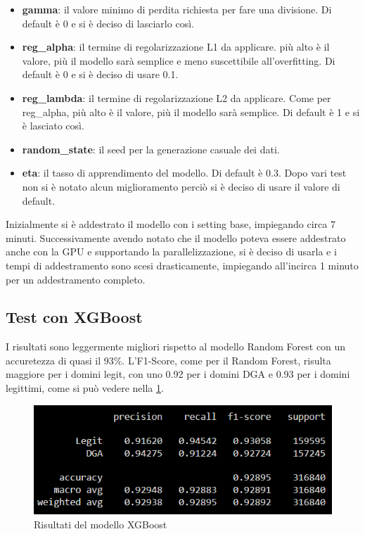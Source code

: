 \documentclass[12pt,a4paper,openright,twoside]{book}
\begin{document}
\begin{itemize}
    \item \textbf{gamma}: il valore minimo di perdita richiesta per fare una divisione.
    Di default è 0 e si è deciso di lasciarlo così.
    \item \textbf{reg\_alpha}: il termine di regolarizzazione L1 da applicare.
    più alto è il valore, più il modello sarà semplice e meno suscettibile all'overfitting.
    Di default è 0 e si è deciso di usare 0.1.
    \item \textbf{reg\_lambda}: il termine di regolarizzazione L2 da applicare.
    Come per reg\_alpha, più alto è il valore, più il modello sarà semplice.
    Di default è 1 e si è lasciato così.
    \item \textbf{random\_state}: il seed per la generazione casuale dei dati.
    \item \textbf{eta}: il tasso di apprendimento del modello.
    Di default è 0.3. Dopo vari test
    non si è notato alcun miglioramento perciò 
    si è deciso di usare il valore di default.
\end{itemize}

\noindent Inizialmente si è addestrato il modello con i setting base, impiegando circa 7 minuti. 
Successivamente avendo notato che il modello
poteva essere addestrato anche con la GPU e supportando la parallelizzazione, si è deciso di usarla
e i tempi di addestramento sono scesi drasticamente,
impiegando all'incirca 1 minuto per un addestramento completo.

\subsection{Test con XGBoost}
I risultati sono leggermente migliori rispetto al modello Random Forest
con un accuretezza di quasi il 93\%. L'F1-Score, come per il Random Forest,
risulta maggiore per i domini legit,
con uno 0.92 per i domini DGA e 0.93 per i domini legittimi,
come si può vedere nella \cref{fig:XGBoost results}.
\begin{figure}[H]
    \centering
    \includegraphics[width=.8\linewidth]{figures/XGBoost_results.png}
    \caption{Risultati del modello XGBoost}
    \label{fig:XGBoost results}
\end{figure}
\end{document}
